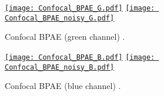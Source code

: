 \documentclass{report}%
\begin{document}
\begin{appendix}
\begin{figure}[h]
  \centering
  \href{https://nbviewer.org/github/vicente-gonzalez-ruiz/denoising/blob/main/notebooks/Confocal_BPAE.ipynb}{\texttt{[image: Confocal\_BPAE\_G.pdf]}}
  \href{https://nbviewer.org/github/vicente-gonzalez-ruiz/denoising/blob/main/notebooks/Confocal_BPAE.ipynb}{\texttt{[image: Confocal\_BPAE\_noisy\_G.pdf]}}
  \caption{Confocal BPAE (green channel) \cite{zhang2019poisson}.\label{fig:Confocal_BPAE_G}}
\end{figure}

\begin{figure}[h]
  \centering
  \href{https://nbviewer.org/github/vicente-gonzalez-ruiz/denoising/blob/main/notebooks/Confocal_BPAE.ipynb}{\texttt{[image: Confocal\_BPAE\_B.pdf]}}
  \href{https://nbviewer.org/github/vicente-gonzalez-ruiz/denoising/blob/main/notebooks/Confocal_BPAE.ipynb}{\texttt{[image: Confocal\_BPAE\_noisy\_B.pdf]}}
  \caption{Confocal BPAE (blue channel) \cite{zhang2019poisson}.\label{fig:Confocal_BPAE_B}}
\end{figure}

\begin{comment}


\begin{figure}[h]
  \centering
  \href{https://nbviewer.org/github/vicente-gonzalez-ruiz/denoising/blob/main/notebooks/TwoPhoton_BPAE.ipynb}{\texttt{[image: TwoPhoton\_BPAE\_R.pdf]}}
  \caption{TwoPhoton BPAE (clean, red channel)\cite{zhang2019poisson}.\label{fig:TwoPhoton_BPAE_R}}
\end{figure}

\begin{figure}[h]
  \centering
  \href{https://nbviewer.org/github/vicente-gonzalez-ruiz/denoising/blob/main/notebooks/TwoPhoton_BPAE.ipynb}{\texttt{[image: TwoPhoton\_BPAE\_G.pdf]}}
  \caption{TwoPhoton BPAE (clean, green channel)\cite{zhang2019poisson}.\label{fig:TwoPhoton_BPAE_G}}
\end{figure}

\begin{figure}[h]
  \centering
  \href{https://nbviewer.org/github/vicente-gonzalez-ruiz/denoising/blob/main/notebooks/TwoPhoton_BPAE.ipynb}{\texttt{[image: TwoPhoton\_BPAE\_B.pdf]}}
  \caption{TwoPhoton BPAE (clean, blue channel)\cite{zhang2019poisson}.\label{fig:TwoPhoton_BPAE_B}}
\end{figure}

\begin{figure}[h]
  \centering
  \href{https://nbviewer.org/github/vicente-gonzalez-ruiz/denoising/blob/main/notebooks/WideField_BPAE.ipynb}{\texttt{[image: WideField\_BPAE.pdf]}}
  \caption{WideField BPAE (clean)\cite{zhang2019poisson}.\label{fig:WideField_BPAE}}
\end{figure}


\end{comment}
\end{appendix}
\end{document}
